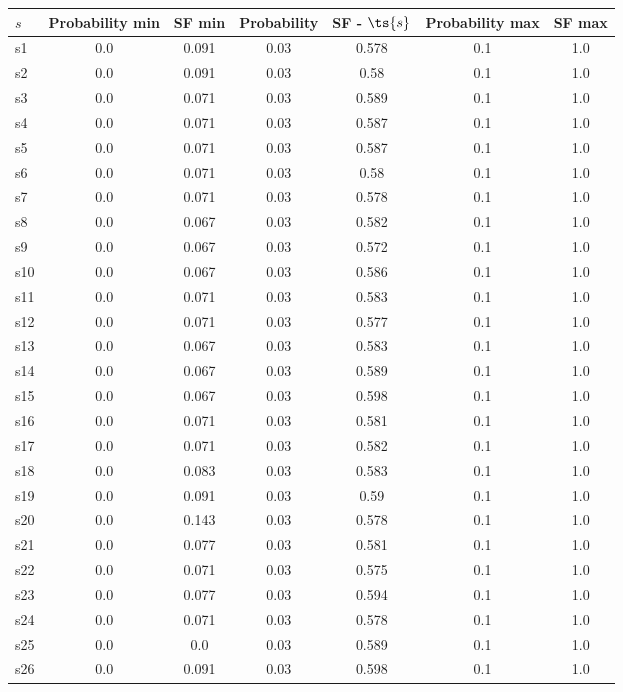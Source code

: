 \documentclass{article}
\begin{document}
\noindent\begin{tabular}{|l|c|c|c|c|c|c|}
\hline
$s$& Probability min & SF min & Probability & SF - $\ts{s}$ & Probability max & SF max\\
\hline
s1 &0.0 & 0.091 & 0.03 & 0.578 & 0.1 & 1.0\\
\hline
s2 &0.0 & 0.091 & 0.03 & 0.58 & 0.1 & 1.0\\
\hline
s3 &0.0 & 0.071 & 0.03 & 0.589 & 0.1 & 1.0\\
\hline
s4 &0.0 & 0.071 & 0.03 & 0.587 & 0.1 & 1.0\\
\hline
s5 &0.0 & 0.071 & 0.03 & 0.587 & 0.1 & 1.0\\
\hline
s6 &0.0 & 0.071 & 0.03 & 0.58 & 0.1 & 1.0\\
\hline
s7 &0.0 & 0.071 & 0.03 & 0.578 & 0.1 & 1.0\\
\hline
s8 &0.0 & 0.067 & 0.03 & 0.582 & 0.1 & 1.0\\
\hline
s9 &0.0 & 0.067 & 0.03 & 0.572 & 0.1 & 1.0\\
\hline
s10 &0.0 & 0.067 & 0.03 & 0.586 & 0.1 & 1.0\\
\hline
s11 &0.0 & 0.071 & 0.03 & 0.583 & 0.1 & 1.0\\
\hline
s12 &0.0 & 0.071 & 0.03 & 0.577 & 0.1 & 1.0\\
\hline
s13 &0.0 & 0.067 & 0.03 & 0.583 & 0.1 & 1.0\\
\hline
s14 &0.0 & 0.067 & 0.03 & 0.589 & 0.1 & 1.0\\
\hline
s15 &0.0 & 0.067 & 0.03 & 0.598 & 0.1 & 1.0\\
\hline
s16 &0.0 & 0.071 & 0.03 & 0.581 & 0.1 & 1.0\\
\hline
s17 &0.0 & 0.071 & 0.03 & 0.582 & 0.1 & 1.0\\
\hline
s18 &0.0 & 0.083 & 0.03 & 0.583 & 0.1 & 1.0\\
\hline
s19 &0.0 & 0.091 & 0.03 & 0.59 & 0.1 & 1.0\\
\hline
s20 &0.0 & 0.143 & 0.03 & 0.578 & 0.1 & 1.0\\
\hline
s21 &0.0 & 0.077 & 0.03 & 0.581 & 0.1 & 1.0\\
\hline
s22 &0.0 & 0.071 & 0.03 & 0.575 & 0.1 & 1.0\\
\hline
s23 &0.0 & 0.077 & 0.03 & 0.594 & 0.1 & 1.0\\
\hline
s24 &0.0 & 0.071 & 0.03 & 0.578 & 0.1 & 1.0\\
\hline
s25 &0.0 & 0.0 & 0.03 & 0.589 & 0.1 & 1.0\\
\hline
s26 &0.0 & 0.091 & 0.03 & 0.598 & 0.1 & 1.0\\

\end{tabular}
\end{document}
